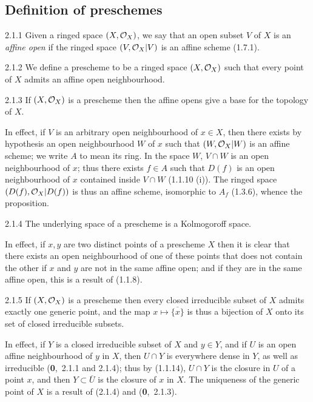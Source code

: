 \documentclass[../main.tex]{subfiles}
\begin{document}
\subsection{Definition of preschemes}

\begin{cx}{2.1.1}
    Given a ringed space $(X,\mathcal{O}_X)$, we say that an open subset $V$ of $X$ is an \emph{affine open} if the ringed space $(V,\mathcal{O}_X|V)$ is an affine scheme (1.7.1).
\end{cx}

\begin{cx}[Definition]{2.1.2}
    We define a prescheme to be a ringed space $(X,\mathcal{O}_X)$ such that every point of $X$ admits an affine open neighbourhood.
\end{cx}

\begin{cx}[Proposition]{2.1.3}
    If $(X,\mathcal{O}_X)$ is a prescheme then the affine opens give a base for the topology of $X$.
\end{cx}

In effect, if $V$ is an arbitrary open neighbourhood of $x\in X$, then there exists by hypothesis an open neighbourhood $W$ of $x$ such that $(W,\mathcal{O}_X|W)$ is an affine scheme; we write $A$ to mean its ring.
In the space $W$, $V\cap W$ is an open neighbourhood of $x$; thus there exists $f\in A$ such that $D(f)$ is an open neighbourhood of $x$ contained inside $V\cap W$ (1.1.10 (i)).
The ringed space $(D(f),\mathcal{O}_X|D(f))$ is thus an affine scheme, isomorphic to $A_f$ (1.3.6), whence the proposition.

\begin{cx}[Proposition]{2.1.4}
    The underlying space of a prescheme is a Kolmogoroff space.
\end{cx}

In effect, if $x,y$ are two distinct points of a prescheme $X$ then it is clear that there exists an open neighbourhood of one of these points that does not contain the other if $x$ and $y$ are not in the same affine open; and if they are in the same affine open, this is a result of (1.1.8).

\begin{cx}[Proposition]{2.1.5}
    If $(X,\mathcal{O}_X)$ is a prescheme then every closed irreducible subset of $X$ admits exactly one generic point, and the map $x\mapsto\overline{\{x\}}$ is thus a bijection of $X$ onto its set of closed irreducible subsets.
\end{cx}

In effect, if $Y$ is a closed irreducible subset of $X$ and $y\in Y$, and if $U$ is an open affine neighbourhood of $y$ in $X$, then $U\cap Y$ is everywhere dense in $Y$, as well as irreducible (\textbf{0},~2.1.1 and 2.1.4); thus by (1.1.14), $U\cap Y$ is the closure in $U$ of a point $x$, and then $Y\subset\overline{U}$ is the closure of $x$ in $X$.
The uniqueness of the generic point of $X$ is a result of (2.1.4) and (\textbf{0},~2.1.3).
\end{document}
